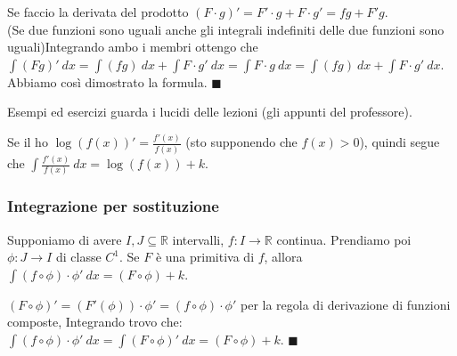 \begin{demostration}
Se faccio la derivata del prodotto $(F \cdot g)' = F'\cdot g + F\cdot g' = fg + F'g$. \\
(Se due funzioni sono uguali anche gli integrali indefiniti delle due funzioni sono uguali)Integrando ambo i membri ottengo che $\int (Fg)'\:dx = \int (fg)\:dx + \int F\cdot g' \:dx = \int F\cdot g\:dx = \int (fg)\:dx + \int F\cdot g' \:dx$. Abbiamo così dimostrato la formula. $\blacksquare$
\end{demostration}

\hspace{-15pt}Esempi ed esercizi guarda i lucidi delle lezioni (gli appunti del professore).

\begin{observation}
Se il ho $\log(f(x))' = \frac{f'(x)}{f(x)}$ (sto supponendo che $f(x) > 0$), quindi segue che $\int \frac{f'(x)}{f(x)} \:dx = \log(f(x)) + k$.
\end{observation}

\subsubsection{Integrazione per sostituzione}
Supponiamo di avere $I,J \subseteq \mathbb{R}$ intervalli, $f: I \to \mathbb{R}$ continua. Prendiamo poi $\phi: J \to I$ di classe $C^1$. Se $F$ è una primitiva di $f$, allora $\int (f \circ \phi) \cdot \phi' \:dx = (F \circ \phi) + k$.

\begin{demostration}
$(F \circ \phi)' = (F'(\phi)) \cdot \phi' = (f \circ \phi) \cdot \phi'$ per la regola di derivazione di funzioni composte, Integrando trovo che: $\int (f \circ \phi) \cdot \phi' \: dx = \int (F \circ \phi)' \:dx = (F \circ \phi) + k$. $\blacksquare$
\end{demostration}

